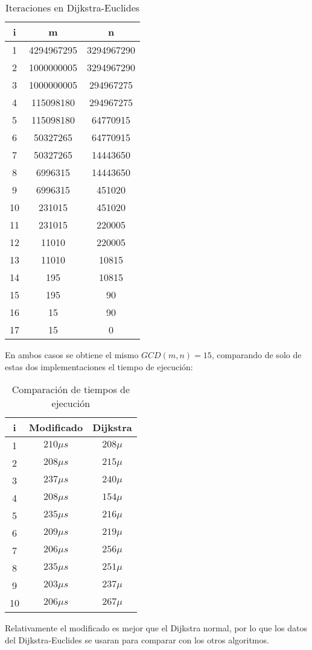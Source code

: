 \documentclass[a4paper,10pt]{article}
\begin{document}
\begin{table}[!h]
\label{tablax}
\begin{center}
\begin{tabular}{|c|c|c|}
\hline 
i&m&n \\
\hline
1&4294967295&3294967290\\\hline
2&1000000005&3294967290\\\hline
3&1000000005&294967275\\\hline
4&115098180&294967275\\\hline
5&115098180&64770915\\\hline
6&50327265&64770915\\\hline
7&50327265&14443650\\\hline
8&6996315&14443650\\\hline
9&6996315&451020\\\hline
10&231015&451020\\\hline
11&231015&220005\\\hline
12&11010&220005\\\hline
13&11010&10815\\\hline
14&195&10815\\\hline
15&195&90\\\hline
16&15&90\\\hline
17&15&0\\\hline
\end{tabular}
\end{center}
\caption{Iteraciones en Dijkstra-Euclides}
\end{table}
En ambos casos se obtiene el mismo $GCD(m,n)=15$, comparando de solo de estas dos implementaciones el tiempo de ejecuci\'on:
\begin{table}[!h]
\label{tablax}
\begin{center}
\begin{tabular}{|c|c|c|}
\hline 
i&Modificado&Dijkstra \\
\hline
1&$210\mu s$&$208\mu$ \\ \hline
2&$208\mu s$&$215\mu$ \\ \hline
3&$237\mu s$&$240\mu$ \\ \hline
4&$208\mu s$&$154\mu$ \\ \hline
5&$235\mu s$&$216\mu$ \\ \hline
6&$209\mu s$&$219\mu$ \\ \hline
7&$206\mu s$&$256\mu$ \\ \hline
8&$235\mu s$&$251\mu$ \\ \hline
9&$203\mu s$&$237\mu$ \\ \hline
10&$206\mu s$&$267\mu$ \\ \hline
\end{tabular}
\end{center}
\caption{Comparaci\'on de tiempos de ejecuci\'on}
\end{table}
Relativamente el modificado es mejor que el Dijkstra normal, por lo que los datos del Dijkstra-Euclides se usaran para comparar con los otros algoritmos.
\end{document}
